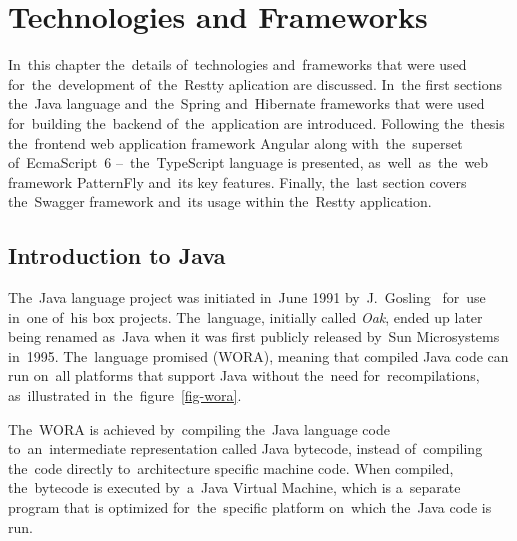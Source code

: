 


\chapter{Technologies and Frameworks}
\label{Technologies}
In~this chapter the~details of~technologies and~frameworks that
were used for~the~development of~the~Restty aplication are discussed. In~the first sections
the~Java language and~the~Spring and~Hibernate frameworks that were
used for~building the~backend of~the~application are introduced. Following the~thesis
the~frontend web application framework Angular along with~the~superset
of~EcmaScript~6 --~the~TypeScript language is presented, as~well~as~the~web
framework PatternFly and~its key features. Finally, the~last section covers
the~Swagger framework and~its usage within the~Restty application.



\section{Introduction to Java}
The~Java language project was initiated in~June 1991 by~J.~Gosling~\cite{Java}
for~use in~one of~his  box projects. The~language, initially called
\textit{Oak}, ended up later being renamed as~Java when it was first publicly
released by~Sun Microsystems in~1995. The~language promised  (WORA), meaning that compiled Java code can run on~all platforms that
support Java without the~need for~recompilations, as~illustrated in~the~figure~\ref{fig-wora}.

The~WORA is achieved by~compiling the~Java language code to~an~intermediate
representation called Java bytecode, instead of~compiling the~code directly
to~architecture specific machine code. When compiled, the~bytecode is executed
by~a~Java Virtual Machine, which is a~separate program that is optimized
for~the~specific platform on~which the~Java code is run.

